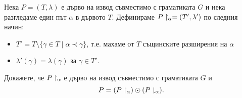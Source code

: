 \begin{problem}
  Нека $P = (T,\lambda)$ е дърво на извод съвместимо с граматиката $G$ и нека разгледаме един път $\alpha$ в дървото $T$.
  Дефинираме ${P}\upharpoonright_{\alpha} = (T',\lambda')$ по следния начин:
  \begin{itemize}
  \item
    $T' = T \setminus \{ \gamma \in T\mid \alpha \prec \gamma\}$, т.е. махаме от $T$ същинските разширения на $\alpha$
  \item
    $\lambda'(\gamma) = \lambda(\gamma)$ за $\gamma \in T'$.
  \end{itemize}
  Докажете, че ${P}\upharpoonright_{\alpha}$ е дърво на извод съвместимо с граматиката $G$ и 
  \[P = ({P}\upharpoonright_{\alpha}) \odot ({P}\downharpoonright_{\alpha}).\]
\end{problem}
